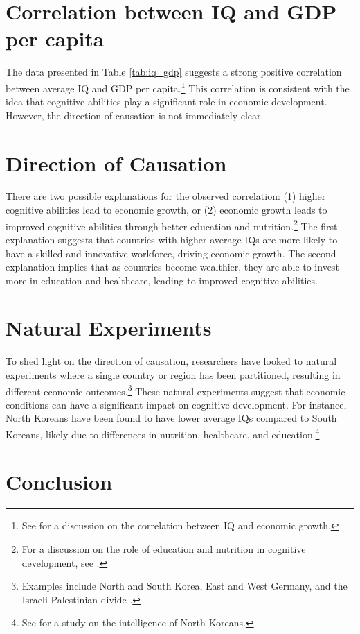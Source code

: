 \documentclass{article}
\begin{document}
\section{Correlation between IQ and GDP per capita}

The data presented in Table \ref{tab:iq_gdp} suggests a strong positive correlation between average IQ and GDP per capita.\footnote{See \cite{JonesSchneider2010} for a discussion on the correlation between IQ and economic growth.} This correlation is consistent with the idea that cognitive abilities play a significant role in economic development. However, the direction of causation is not immediately clear.

\section{Direction of Causation}

There are two possible explanations for the observed correlation: (1) higher cognitive abilities lead to economic growth, or (2) economic growth leads to improved cognitive abilities through better education and nutrition.\footnote{For a discussion on the role of education and nutrition in cognitive development, see \cite{Nisbett2009}.} The first explanation suggests that countries with higher average IQs are more likely to have a skilled and innovative workforce, driving economic growth. The second explanation implies that as countries become wealthier, they are able to invest more in education and healthcare, leading to improved cognitive abilities.

\section{Natural Experiments}

To shed light on the direction of causation, researchers have looked to natural experiments where a single country or region has been partitioned, resulting in different economic outcomes.\footnote{Examples include North and South Korea, East and West Germany, and the Israeli-Palestinian divide \cite{HanushekWoessmann2015}.} These natural experiments suggest that economic conditions can have a significant impact on cognitive development. For instance, North Koreans have been found to have lower average IQs compared to South Koreans, likely due to differences in nutrition, healthcare, and education.\footnote{See \cite{Lynn2013} for a study on the intelligence of North Koreans.}

\section{Conclusion}
\end{document}
